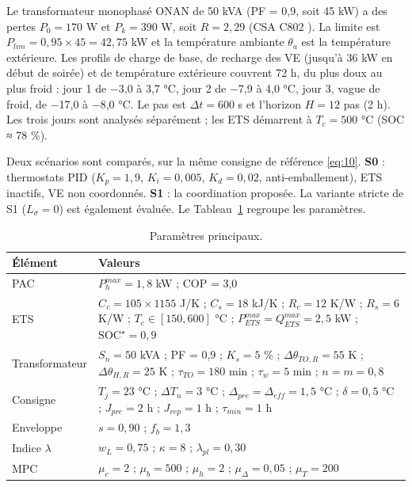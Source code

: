 \documentclass[conference]{IEEEtran}
\begin{document}
Le transformateur monophasé ONAN de 50 kVA (PF = 0,9, soit 45 kW) a des pertes \(P_0=170\) W et \(P_k=390\) W, soit \(R=2{,}29\) (CSA C802 \cite{Wiegand1994}). La limite est \(P_{lim}=0{,}95\times45=42{,}75\) kW et la température ambiante \(\theta_a\) est la température extérieure. Les profils de charge de base, de recharge des VE (jusqu'à 36 kW en début de soirée) et de température extérieure couvrent 72 h, du plus doux au plus froid : jour 1 de −3,0 à 3,7 °C, jour 2 de −7,9 à 4,0 °C, jour 3, vague de froid, de −17,0 à −8,0 °C. Le pas est \(\Delta t=600\) s et l'horizon \(H=12\) pas (2 h). Les trois jours sont analysés séparément ; les ETS démarrent à \(T_c=500\) °C (SOC ≈ 78 \%).

Deux scénarios sont comparés, sur la même consigne de référence \eqref{eq:10}. \textbf{S0} : thermostats PID (\(K_p=1{,}9\), \(K_i=0{,}005\), \(K_d=0{,}02\), anti-emballement), ETS inactifs, VE non coordonnés. \textbf{S1} : la coordination proposée. La variante stricte de S1 (\(L_\sigma=0\)) est également évaluée. Le Tableau~\ref{tab:IV} regroupe les paramètres.

\begin{table}[tb]
\centering\footnotesize
\caption{Paramètres principaux.}\label{tab:IV}
\begin{tabular}{>{\raggedright\arraybackslash}p{}>{\raggedright\arraybackslash}p{}}
\toprule
\textbf{Élément} & \textbf{Valeurs} \\
\midrule
PAC & \(P^{max}_h=1{,}8\) kW ; COP = 3,0 \\
ETS & \(C_c=105\times1155\) J/K ; \(C_s=18\) kJ/K ; \(R_c=12\) K/W ; \(R_s=6\) K/W ; \(T_c\in[150,600]\) °C ; \(P^{max}_{ETS}=Q^{max}_{ETS}=2{,}5\) kW ; \(\mathrm{SOC}^\star=0{,}9\) \\
Transformateur & \(S_n=50\) kVA ; PF = 0,9 ; \(K_s=5\) \% ; \(\Delta\theta_{TO,R}=55\) K ; \(\Delta\theta_{H,R}=25\) K ; \(\tau_{TO}=180\) min ; \(\tau_w=5\) min ; \(n=m=0{,}8\) \\
Consigne & \(T_j=23\) °C ; \(\Delta T_n=3\) °C ; \(\Delta_{pre}=\Delta_{eff}=1{,}5\) °C ; \(\delta=0{,}5\) °C ; \(J_{pre}=2\) h ; \(J_{rep}=1\) h ; \(\tau_{min}=1\) h \\
Enveloppe & \(s=0{,}90\) ; \(f_b=1{,}3\) \\
Indice \(\lambda\) & \(w_L=0{,}75\) ; \(\kappa=8\) ; \(\lambda_{pl}=0{,}30\) \\
MPC & \(\mu_c=2\) ; \(\mu_b=500\) ; \(\mu_h=2\) ; \(\mu_\Delta=0{,}05\) ; \(\mu_T=200\) \\
\bottomrule
\end{tabular}
\end{table}
\end{document}
